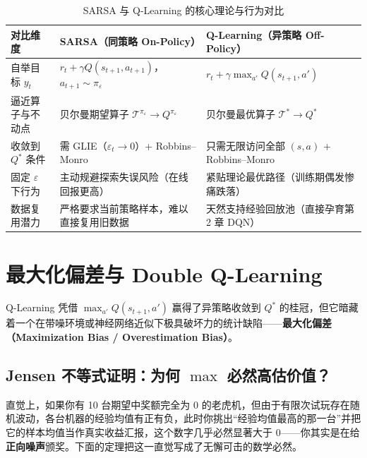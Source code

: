 \begin{table}[htbp]
\centering
\caption{SARSA 与 Q-Learning 的核心理论与行为对比}
\label{tab:sarsa-vs-q}
\small
\begin{tabularx}{\linewidth}{@{}p{28mm}XX@{}}
\toprule
\textbf{对比维度} & \textbf{SARSA（同策略 On-Policy）} & \textbf{Q-Learning（异策略 Off-Policy）} \\
\midrule
自举目标 $y_t$ & $r_t + \gamma Q(s_{t+1}, a_{t+1})$，$a_{t+1} \sim \pi_\varepsilon$ & $r_t + \gamma \max_{a'} Q(s_{t+1}, a')$ \\
逼近算子与不动点 & 贝尔曼期望算子 $\mathcal{T}^{\pi_\varepsilon} \to Q^{\pi_\varepsilon}$ & 贝尔曼最优算子 $\mathcal{T}^* \to Q^*$ \\
收敛到 $Q^*$ 条件 & 需 GLIE（$\varepsilon_t \to 0$）+ Robbins--Monro & 只需无限访问全部 $(s,a)$ + Robbins--Monro \\
固定 $\varepsilon$ 下行为 & 主动规避探索失误风险（在线回报更高） & 紧贴理论最优路径（训练期偶发惨痛跌落） \\
数据复用潜力 & 严格要求当前策略样本，难以直接复用旧数据 & 天然支持经验回放池（直接孕育第 2 章 DQN） \\
\bottomrule
\end{tabularx}
\end{table}

\section{最大化偏差与 Double Q-Learning}
\label{sec:rl-double-q}

Q-Learning 凭借 $\max_{a'} Q(s_{t+1}, a')$ 赢得了异策略收敛到 $Q^*$ 的桂冠，但它暗藏着一个在带噪环境或神经网络近似下极具破坏力的统计缺陷——\textbf{最大化偏差（Maximization Bias / Overestimation Bias）}。

\subsection{Jensen 不等式证明：为何 $\max$ 必然高估价值？}

直觉上，如果你有 10 台期望中奖额完全为 $0$ 的老虎机，但由于有限次试玩存在随机波动，各台机器的经验均值有正有负，此时你挑出“经验均值最高的那一台”并把它的样本均值当作真实收益汇报，这个数字几乎必然显著大于 $0$——你其实是在给\textbf{正向噪声}颁奖。下面的定理把这一直觉写成了无懈可击的数学必然。

